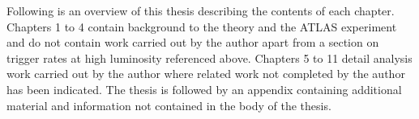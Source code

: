 

















Following is an overview of this thesis describing the contents of each chapter. Chapters 1 to 4 contain background to the theory and the ATLAS experiment and do not contain work carried out by the author apart from a section on trigger rates at high luminosity referenced above. Chapters 5 to 11 detail analysis work carried out by the author where related work not completed by the author has been indicated. The thesis is followed by an appendix containing additional material and information not contained in the body of the thesis.

